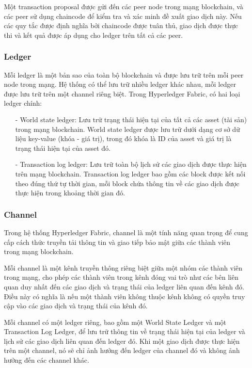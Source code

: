 Một transaction proposal được gửi đến các peer node trong mạng blockchain, và các 
peer sử dụng chaincode để kiểm tra và xác minh đề xuất giao dịch này. Nếu các quy 
tắc được định nghĩa bởi chaincode được tuân thủ, giao dịch được thực thi và kết 
quả được áp dụng cho ledger trên tất cả các peer.

\subsubsection{Ledger}
Mỗi ledger là một bản sao của toàn bộ blockchain và được lưu trữ trên mỗi peer node trong mạng.
Hệ thống có thể lưu trữ nhiều ledger khác nhau, mỗi ledger được lưu trữ trên một channel riêng biệt. 
Trong Hyperledger Fabric, có hai loại ledger chính:

\begin{itemize}
    \item[-] World state ledger: Lưu trữ trạng thái hiện tại của tất cả các 
    asset (tài sản) trong mạng blockchain. World state ledger được lưu trữ dưới dạng cơ sở dữ liệu key-value (khóa - giá trị), trong đó khóa là ID của asset và giá trị là trạng thái hiện tại của asset đó.
    \item[-] Transaction log ledger: Lưu trữ toàn bộ lịch sử các giao dịch được thực hiện 
    trên mạng blockchain. Transaction log ledger bao gồm các block được kết nối theo đúng 
    thứ tự thời gian, mỗi block chứa thông tin về các giao dịch được thực hiện trong khoảng 
    thời gian đó.
\end{itemize}
\subsubsection{Channel}

Trong hệ thống Hyperledger Fabric, channel là một tính năng quan trọng để cung cấp cách thức 
truyền tải thông tin và giao tiếp bảo mật giữa các thành viên trong mạng blockchain.

Mỗi channel là một kênh truyền thông riêng biệt giữa một nhóm các thành viên trong mạng, 
cho phép các thành viên trong kênh đóng vai trò như các bên liên quan duy nhất đến các giao 
dịch và trạng thái của ledger liên quan đến kênh đó. Điều này có nghĩa là nếu một thành 
viên không thuộc kênh không có quyền truy cập vào các giao dịch và trạng thái của kênh đó.

Mỗi channel có một ledger riêng, bao gồm một World State Ledger và một Transaction Log Ledger, 
để lưu trữ thông tin về trạng thái hiện tại của ledger và lịch sử các giao dịch liên quan đến 
ledger đó. Khi một giao dịch được thực hiện trên một channel, nó sẽ chỉ ảnh hưởng đến ledger 
của channel đó và không ảnh hưởng đến các channel khác.


